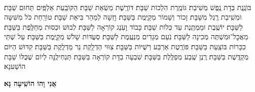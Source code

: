 \documentclass[twoside, openany, parskip=half, 11pt]{book}
\begin{document}
\anivho

\newcommand{\hoshia}{
הוֹשִׁ֤יעָה \source{תהלים כח}אֶת־עַמֶּ֗ךָ וּבָרֵ֥ךְ אֶת־נַֽחֲלָתֶ֑ךָ וּֽרְעֵ֥ם וְ֝נַשְּׂאֵ֗ם עַד־הָֽעוֹלָֽם׃ \source{מל״א ח}וְיִֽהְי֨וּ דְבָרַ֜י אֵ֗לֶּה אֲשֶׁ֤ר הִתְחַנַּ֙נְתִּי֙ לִפְנֵ֣י יְהֹוָ֔ה קְרֹבִ֛ים אֶל־יְהֹוָ֥ה אֱלֹהֵ֖ינוּ יוֹמָ֣ם וָלָ֑יְלָה לַעֲשׂ֣וֹת ׀ מִשְׁפַּ֣ט עַבְדּ֗וֹ וּמִשְׁפַּ֛ט עַמּ֥וֹ יִשְׂרָאֵ֖ל דְּבַר־י֥וֹם בְּיוֹמֽוֹ׃ לְמַ֗עַן דַּ֚עַת כׇּל־עַמֵּ֣י הָאָ֔רֶץ כִּ֥י יְהֹוָ֖ה ה֣וּא הָאֱלֹהִ֑ים אֵ֖ין עֽוֹד׃
}

\sepline

\label{hoshanotshabbat}
\\
בּוֹנֶֽנֶת בְּדָת נֶֽפֶשׁ מְשִׁיבַת׃ גּוֹמֶֽרֶת הִלְכוֹת שַׁבָּת׃ דּוֹרֶֽשֶׁת מַשְׂאַת שַׁבָּת׃ הַקּוֹבַֽעַת אַלְפַּֽיִם תְּחוּם שַׁבָּת׃ וּמְשִֽׁיבַת רֶֽגֶל מִשַּׁבָּת׃ זָכוֹר וְשָׁמוֹר מְקַיֶּֽמֶת בַּשַּׁבָּת׃ חָֽשָׁה לְמַהֵר בִּיאַת שַׁבָּת׃ טוֹרַֽחַת כֹּל מִשִּׁשָּה לַשַּׁבָּת׃ יוֹשֶֽׁבֶת וּמַמְתֶּֽנֶת עַד כְּלוֹת שַׁבָּת׃ כָּבוֹד וָעֹֽנֶג קוֹרְאָה לַשַּׁבָּת׃ לְבוּשׁ וּכְסוּת מְחַלֶּֽפֶת בַּשַּׁבָּת׃ מַאֲכׇל־וּמִשְׁתֶּה מְכִינָה לַשַּׁבָּת׃ נֹֽעַם מְגָדִים מַנְעֶֽמֶת לַשַּׁבָּת׃ סְעֻדּוֹת שָׁלֹשׁ מְקַיֶּֽמֶת בַּשַּׁבָּת׃ עַל שְׁתֵּי כִכָּרוֹת בּוֹצַֽעַת בַּשַּׁבָּת׃ פּוֹרֶֽטֶת אַרְבַּע רְשֻׁיּוֹת בַּשַּׁבָּת׃ צִוּוּי הַדְלָֽקַת נֵר מַדְלֶֽקֶת בַּשַּׁבָּת׃ קִדּוּשׁ הַיּוֹם מְקַדֶּֽשֶׁת בַּשַּׁבָּת׃ רֶֽנֶן שֶֽׁבַע מְפַלֶּֽלֶת בַּשַּׁבָּת׃ שִׁבְעָה בַדָּת קוֹרְאָה בַּשַּׁבָּת׃ תַּנְחִילֶֽנָּה לְיוֹם שֶׁכֻּלּוֹ שַׁבָּת הוֹשַׁענָא׃

\begin{large}
\textbf{אֲנִי וָהוֹ הוֹשִֽׁיעָה נָּא׃}
\end{large}
\end{document}
